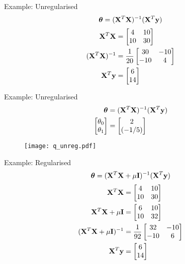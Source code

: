 \documentclass{beamer}
\begin{document}
\begin{frame}{Example: Unregularised}
\[
\boldsymbol{\theta} = (\mathbf{X}^{T}\mathbf{X})^{-1}(\mathbf{X}^{T}\mathbf{y})
\]
\pause
\begin{align*}
\mathbf{X}^{T}\mathbf{X} &= \begin{bmatrix}
4 &10\\10&30
\end{bmatrix} \\
(\mathbf{X}^{T}\mathbf{X})^{-1} &= \frac{1}{20} \begin{bmatrix}
30 & -10\\
-10& 4
\end{bmatrix}\\
\mathbf{X}^{T}\mathbf{y} &= \begin{bmatrix}
6\\
14
\end{bmatrix}
\end{align*}
\end{frame}


\begin{frame}{Example: Unregularised}
\vspace{0.4cm}
\begin{align*}
\begin{split}
\boldsymbol{\theta} &= (\mathbf{X}^{T}\mathbf{X})^{-1}(\mathbf{X}^{T}\mathbf{y})\\
\begin{bmatrix}
\theta_{0}\\
\theta_{1}
\end{bmatrix} &= 
\begin{bmatrix}
2\\
(-1/5)
\end{bmatrix} 
\end{split}
\end{align*}
\vspace{-0.8cm}
\begin{figure}
\texttt{[image: q\_unreg.pdf]}
\end{figure}
\end{frame}

\begin{frame}{Example: Regularised}
\[
\boldsymbol{\theta} = (\mathbf{X}^{T}\mathbf{X}+\mu \mathbf{I})^{-1}(\mathbf{X}^{T}\mathbf{y})
\]
\pause
\begin{align*}
\mathbf{X}^{T}\mathbf{X} &= \begin{bmatrix}
4 &10\\10&30
\end{bmatrix} \\
\mathbf{X}^{T}\mathbf{X}+\mu \mathbf{I} &= \begin{bmatrix}
6 &10\\10&32
\end{bmatrix} \\
(\mathbf{X}^{T}\mathbf{X}+\mu \mathbf{I})^{-1} &= \frac{1}{92} \begin{bmatrix}
32 & -10\\
-10& 6
\end{bmatrix}\\
\mathbf{X}^{T}\mathbf{y} &= \begin{bmatrix}
6\\
14
\end{bmatrix}
\end{align*}
\end{frame}
\end{document}
